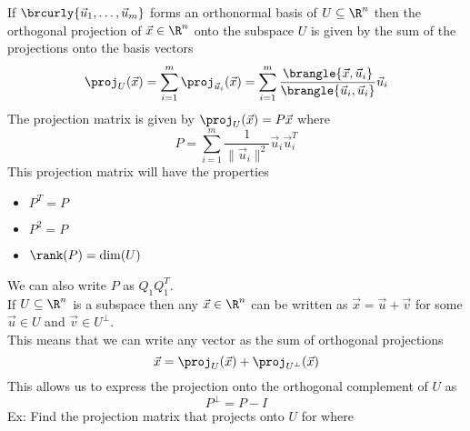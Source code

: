 If $\brcurly{\vec{u}_1,\ldots,\vec{u}_m}$ forms an orthonormal basis of $U\subseteq\R^n$ then the orthogonal projection of $\vec{x}\in\R^n$ onto the subspace $U$ is given by the sum of the projections onto the basis vectors
$$\proj_{U}(\vec{x})=\sum_{i=1}^m\proj_{\vec{u}_i}(\vec{x})=\sum_{i=1}^m\frac{\brangle{\vec{x},\vec{u}_i}}{\brangle{\vec{u}_i,\vec{u}_i}}\vec{u}_i$$
The projection matrix is given by $\proj_U(\vec{x})=P\vec{x}$ where
$$P=\sum_{i=1}^m\frac{1}{\|\vec{u}_i\|^2}\vec{u}_i\vec{u}_i^T$$
This projection matrix will have the properties
\begin{itemize}
    \item $P^T=P$
    \item $P^2=P$
    \item $\rank(P)=\dim(U)$
\end{itemize}
We can also write $P$ as $Q_1Q_1^T$.\\
If $U\subseteq\R^n$ is a subspace then any $\vec{x}\in\R^n$ can be written as $\vec{x}=\vec{u}+\vec{v}$ for some $\vec{u}\in U$ and $\vec{v}\in U^\perp$.\\
This means that we can write any vector as the sum of orthogonal projections
$$\vec{x}=\proj_{U}(\vec{x})+\proj_{U^\perp}(\vec{x})$$
This allows us to express the projection onto the orthogonal complement of $U$ as
$$P^\perp=P-I$$
Ex: Find the projection matrix that projects onto $U$ for where
